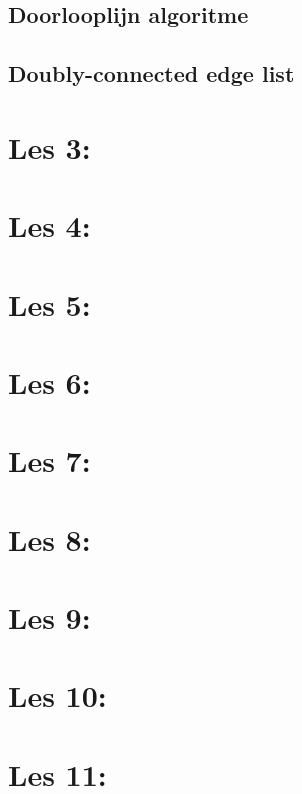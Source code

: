 \documentclass[12pt,a4paper]{article}
\begin{document}
	\subsection{Doorlooplijn algoritme}
	\subsection{Doubly-connected edge 	list}
	\section{Les 3: }
	\section{Les 4: }
	\section{Les 5: }
	\section{Les 6: }
	\section{Les 7: }
	\section{Les 8: }
	\section{Les 9: }
	\section{Les 10: }
	\section{Les 11: }
\end{document}
